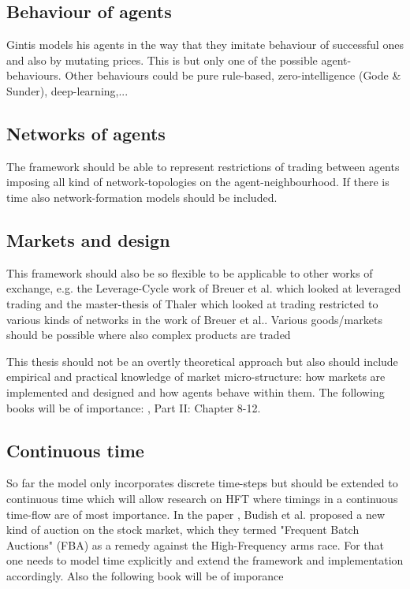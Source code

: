 \documentclass{article}
\begin{document}
\subsection{Behaviour of agents}
Gintis models his agents in the way that they imitate behaviour of successful ones and also by mutating prices. This is but only one of the possible agent-behaviours. Other behaviours could be pure rule-based, zero-intelligence (Gode \& Sunder), deep-learning,...

\subsection{Networks of agents}
The framework should be able to represent restrictions of trading between agents imposing all kind of network-topologies on the agent-neighbourhood. If there is time also network-formation models should be included.

\subsection{Markets and design}
This framework should also be so flexible to be applicable to other works of exchange, e.g. the Leverage-Cycle work of Breuer et al. which looked at leveraged trading and the master-thesis of Thaler which looked at trading restricted to various kinds of networks in the work of Breuer et al.. Various goods/markets should be possible where also complex products are traded

This thesis should not be an overtly theoretical approach but also should include empirical and practical knowledge of market micro-structure: how markets are implemented and designed and how agents behave within them. The following books will be of importance: \cite{LehalleLaruelle2013}, \cite{baker_market_2013} Part II: Chapter 8-12.

\subsection{Continuous time}
So far the model only incorporates discrete time-steps but should be extended to continuous time which will allow research on HFT where timings in a continuous time-flow are of most importance. In the paper \cite{Budish2015}, Budish et al. proposed a new kind of auction on the stock market, which they termed "Frequent Batch Auctions" (FBA) as a remedy against the High-Frequency arms race. For that one needs to model time explicitly and extend the framework and implementation accordingly. Also the following book will be of imporance \cite{aldridge_high_frequency_2009}
\end{document}
